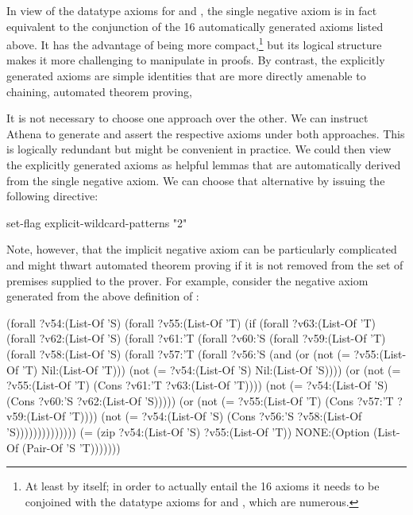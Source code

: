 In view of the datatype axioms for  and , 
the single negative axiom
is in fact equivalent to the conjunction of the 16 automatically generated
axioms listed above. It has the advantage of being more compact,\footnote{At 
least by itself; in order to actually entail the 16 axioms it needs to be conjoined
with the datatype axioms for  and , which are
numerous.} but its logical structure makes it more challenging 
to manipulate in proofs. By contrast, the explicitly generated axioms 
are simple identities that are more directly amenable to chaining, 
automated theorem proving, \etcsp 

It is not necessary to choose one approach over the other. We can
instruct Athena to generate and assert the respective axioms under
both approaches. This is logically redundant but might be 
convenient in practice. We could then view the explicitly generated 
axioms as helpful lemmas that are automatically derived from the 
single negative axiom. We can choose that alternative 
by issuing the following directive: 
\begin{tcAthena}
set-flag explicit-wildcard-patterns "2" 
\end{tcAthena}
Note, however, that the implicit negative axiom can be
particularly complicated and might thwart automated theorem
proving if it is not removed from the set of premises supplied
to the prover. For example, consider the negative axiom 
generated from the above definition of : 
\begin{tcAthena}
(forall ?v54:(List-Of 'S)
  (forall ?v55:(List-Of 'T)
    (if (forall ?v63:(List-Of 'T)
          (forall ?v62:(List-Of 'S)
            (forall ?v61:'T
              (forall ?v60:'S
                (forall ?v59:(List-Of 'T)
                  (forall ?v58:(List-Of 'S)
                    (forall ?v57:'T
                      (forall ?v56:'S
                        (and (or (not (= ?v55:(List-Of 'T)
                                         Nil:(List-Of 'T)))
                                 (not (= ?v54:(List-Of 'S)
                                         Nil:(List-Of 'S))))
                             (or (not (= ?v55:(List-Of 'T)
                                         (Cons ?v61:'T
                                               ?v63:(List-Of 'T))))
                                 (not (= ?v54:(List-Of 'S)
                                         (Cons ?v60:'S
                                               ?v62:(List-Of 'S)))))
                             (or (not (= ?v55:(List-Of 'T)
                                         (Cons ?v57:'T
                                               ?v59:(List-Of 'T))))
                                 (not (= ?v54:(List-Of 'S)
                                         (Cons ?v56:'S
                                               ?v58:(List-Of 'S))))))))))))))
        (= (zip ?v54:(List-Of 'S)
                ?v55:(List-Of 'T))
           NONE:(Option (List-Of (Pair-Of 'S 'T)))))))
\end{tcAthena}
